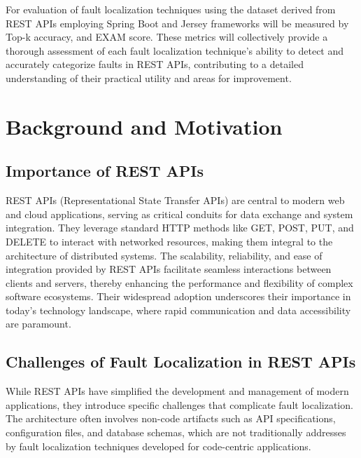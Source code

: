 \documentclass[conference]{IEEEtran}
\newcommand{\todo}[1]{\textcolor{red}{{\bfseries [[#1]]}}}
\begin{document}
For evaluation of fault localization techniques using the dataset derived from REST APIs employing Spring Boot and Jersey frameworks will be measured by Top-k accuracy, and EXAM score.
These metrics will collectively provide a thorough assessment of each fault localization technique's ability to detect and accurately categorize faults in REST APIs, contributing to a detailed understanding of their practical utility and areas for improvement.



\section{Background and Motivation}
\label{sec:background-and-motivation}

\subsection{Importance of REST APIs}

REST APIs (Representational State Transfer APIs) are central to modern web and cloud applications, serving as critical conduits for data exchange and system integration. 
They leverage standard HTTP methods like GET, POST, PUT, and DELETE to interact with networked resources, making them integral to the architecture of distributed systems. 
The scalability, reliability, and ease of integration provided by REST APIs facilitate seamless interactions between clients and servers, thereby enhancing the performance and flexibility of complex software ecosystems. 
Their widespread adoption underscores their importance in today's technology landscape, where rapid communication and data accessibility are paramount.

\subsection{Challenges of Fault Localization in REST APIs}
While REST APIs have simplified the development and management of modern applications, they introduce specific challenges that complicate fault localization.
The architecture often involves non-code artifacts such as API specifications, configuration files, and database schemas, which are not traditionally addresses by fault localization techniques developed for code-centric applications. 
\end{document}
